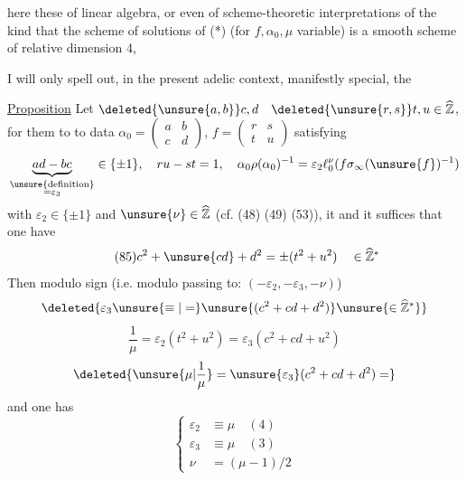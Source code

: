 
here these   of linear algebra,
or even of scheme-theoretic interpretations of the kind that the scheme of solutions of (*)
(for $f,\alpha_0,\mu$ variable) is a smooth  scheme of relative dimension 4, 

I will only spell out, in the present adelic context, manifestly  special, the

\uline{Proposition} Let $\deleted{\unsure{a,b}}c,d\quad\deleted{\unsure{r,s}}t,u\in\widehat{\mathbb Z}$,
for them to  to data
$\alpha_0=\begin{pmatrix}a&b\\c&d\end{pmatrix}$,
$f=\begin{pmatrix}r&s\\t&u\end{pmatrix}$ satisfying
\[
\underbrace{ad-bc}_{\substack{\unsure{\text{definition}}\\=\varepsilon_3}}\in\{\pm1\},
\quad ru-st=1,
\quad\alpha_0\rho(\alpha_0)^{-1}=\varepsilon_2\ell_0^{\nu}(f\sigma_\infty(\unsure{f})^{-1})
\]
with $\varepsilon_2\in\{\pm1\}$ and $\unsure{\nu}\in\widehat{\mathbb Z}$
 (cf. (48) (49) (53)),
it  and  it suffices that one have
\[
\tag{85}
c^2+\unsure{cd}+d^2=\pm(t^2+u^2)\quad\in\widehat{\mathbb Z}^*
\]
Then 
modulo sign (i.e. modulo passing to: $(-\varepsilon_2,-\varepsilon_3,-\nu)$)
\[
\deleted{\varepsilon_3\unsure{\equiv|=}\unsure{(c^2+cd+d^2)}\unsure{\in\widehat{\mathbb Z}^*}}
\]
\[
\tag{86}
\frac1\mu=\varepsilon_2(t^2+u^2)=\varepsilon_3(c^2+cd+u^2)
\]
\[
\deleted{\unsure{\mu|\frac1\mu}=\unsure{\varepsilon_3}(c^2+cd+d^2)=}
\]
and one has
\[
\tag{87}
\left\{\begin{aligned}
\varepsilon_2&\equiv\mu\quad(4)\\
\varepsilon_3&\equiv\mu\quad(3)\\
\nu&=(\mu-1)/2
\end{aligned}\right.
\]


